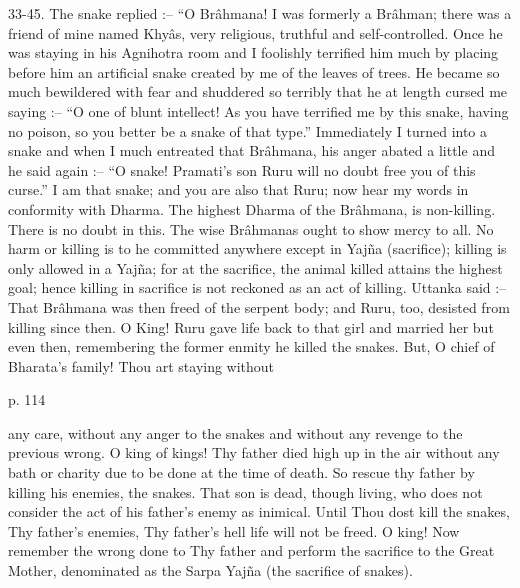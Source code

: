  

33-45. The snake replied :-- “O Brâhmana! I was formerly a Brâhman; there was a friend of mine named Khyâs, very religious, truthful and self-controlled. Once he was staying in his Agnihotra room and I foolishly terrified him much by placing before him an artificial snake created by me of the leaves of trees. He became so much bewildered with fear and shuddered so terribly that he at length cursed me saying :-- “O one of blunt intellect! As you have terrified me by this snake, having no poison, so you better be a snake of that type.” Immediately I turned into a snake and when I much entreated that Brâhmana, his anger abated a little and he said again :-- “O snake! Pramati's son Ruru will no doubt free you of this curse.” I am that snake; and you are also that Ruru; now hear my words in conformity with Dharma. The highest Dharma of the Brâhmana, is non-killing. There is no doubt in this. The wise Brâhmanas ought to show mercy to all. No harm or killing is to he committed anywhere except in Yajña (sacrifice); killing is only allowed in a Yajña; for at the sacrifice, the animal killed attains the highest goal; hence killing in sacrifice is not reckoned as an act of killing. Uttanka said :-- That Brâhmana was then freed of the serpent body; and Ruru, too, desisted from killing since then. O King! Ruru gave life back to that girl and married her but even then, remembering the former enmity he killed the snakes. But, O chief of Bharata's family! Thou art staying without

 

p. 114

 

any care, without any anger to the snakes and without any revenge to the previous wrong. O king of kings! Thy father died high up in the air without any bath or charity due to be done at the time of death. So rescue thy father by killing his enemies, the snakes. That son is dead, though living, who does not consider the act of his father's enemy as inimical. Until Thou dost kill the snakes, Thy father's enemies, Thy father's hell life will not be freed. O king! Now remember the wrong done to Thy father and perform the sacrifice to the Great Mother, denominated as the Sarpa Yajña (the sacrifice of snakes).

 

